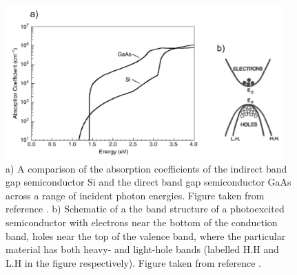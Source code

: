 \documentclass[11pt, twoside]{report}
\begin{document}
\begin{figure}[h!]
  \centering
    \includegraphics[width=0.95\textwidth]{figures/ab+m_eff.png}
    \caption[a) A comparison of the absorption coefficients of the indirect band gap semiconductor Si and the direct band gap semiconductor GaAs across a range of incident photon energies. b) Schematic of a the band structure of a photoexcited semiconductor with electrons near the bottom of the conduction band, holes near the top of the valence band, where the particular material has both heavy- and light-hole bands (labelled H.H and L.H in the figure respectively).]{a) A comparison of the absorption coefficients of the indirect band gap semiconductor Si and the direct band gap semiconductor GaAs across a range of incident photon energies. Figure taken from reference . b) Schematic of a the band structure of a photoexcited semiconductor with electrons near the bottom of the conduction band, holes near the top of the valence band, where the particular material has both heavy- and light-hole bands (labelled H.H and L.H in the figure respectively). Figure taken from reference .}
  \label{ab+m_eff}
\end{figure}
\end{document}
